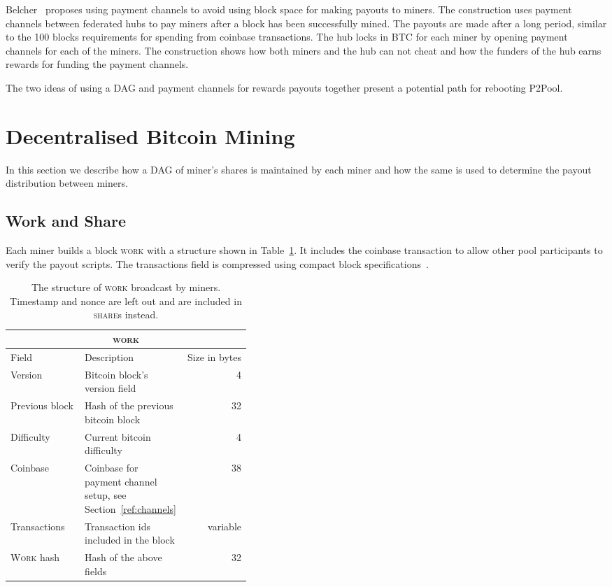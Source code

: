 \documentclass{article}
\begin{document}
Belcher~\cite{channels-for-rewards} proposes using payment channels to
avoid using block space for making payouts to miners. The construction
uses payment channels between federated hubs to pay miners after a
block has been successfully mined. The payouts are made after a long
period, similar to the 100 blocks requirements for spending from
coinbase transactions. The hub locks in BTC for each miner by opening
payment channels for each of the miners. The construction shows how
both miners and the hub can not cheat and how the funders of the hub
earns rewards for funding the payment channels.

The two ideas of using a DAG and payment channels for rewards
payouts together present a potential path for rebooting P2Pool.

\section{Decentralised Bitcoin Mining}

In this section we describe how a DAG of miner's shares is maintained
by each miner and how the same is used to determine the payout
distribution between miners.

\subsection{Work and Share}

Each miner builds a block \textsc{work} with a structure shown in
Table~\ref{table:work}. It includes the coinbase transaction to allow
other pool participants to verify the payout scripts. The transactions
field is compressed using compact block
specifications~\cite{compact-blocks}.

\begin{table}
  \centering
  \begin{tabular}{ lp{0.4\linewidth}r }
    \multicolumn{3}{c}{\textsc{work}} \\
    \hline
    Field & Description & Size in bytes \\
    \hline
    Version & Bitcoin block's version field & 4\\
    Previous block & Hash of the previous bitcoin block & 32 \\
    Difficulty & Current bitcoin difficulty & 4 \\
    Coinbase & Coinbase for payment channel setup, see Section~\ref{ref:channels} & 38 \\
    Transactions & Transaction ids included in the block & variable \\
    \textsc{Work} hash & Hash of the above fields & 32 \\
    \hline
  \end{tabular}
  \caption{The structure of \textsc{work} broadcast by
    miners. Timestamp and nonce are left out and are included in
    \textsc{share}s instead.}\label{table:work}
\end{table}
\end{document}
